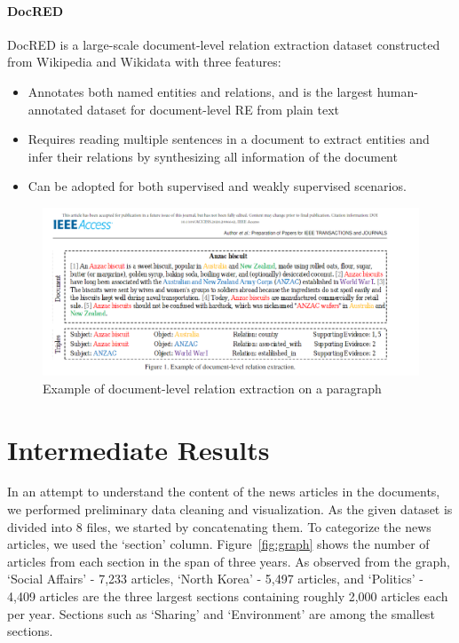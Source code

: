 \documentclass[sigconf,authorversion,nonacm]{acmart}
\begin{document}
\paragraph{DocRED}
DocRED is a large-scale document-level relation extraction dataset constructed from Wikipedia and Wikidata with three features:
\begin{itemize}
    \item Annotates both named entities and relations, and is the largest human-annotated dataset for document-level RE from plain text
    \item Requires reading multiple sentences in a document to extract entities and infer their relations by synthesizing all information of the document
    \item Can be adopted for both supervised and weakly supervised scenarios.
\end{itemize}

\begin{figure}[h]
    \centering
    \includegraphics[width=\linewidth]{img/relax.png}
    \caption{Example of document-level relation extraction on a paragraph}
\end{figure}

\section{Intermediate Results}
In an attempt to understand the content of the news articles in the documents, we performed preliminary data cleaning and visualization. As the given dataset is divided into 8 files, we started by concatenating them. To categorize the news articles, we used the ‘section’ column. Figure~\ref{fig:graph} shows the number of articles from each section in the span of three years. As observed from the graph, ‘Social Affairs’ - 7,233 articles, ‘North Korea’ - 5,497 articles, and ‘Politics’ - 4,409 articles are the three largest sections containing roughly 2,000 articles each per year. Sections such as ‘Sharing’ and ‘Environment’ are among the smallest sections.
\end{document}
